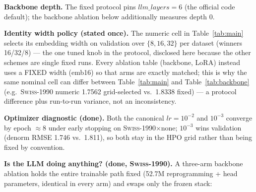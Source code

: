 \documentclass[sigconf,review]{acmart}
\newcommand{\swiss}{\textsc{Swiss-1990}}
\begin{document}
\textbf{Backbone depth.} The fixed protocol pins $\mathit{llm\_layers}{=}6$ (the
official code default); the backbone ablation below additionally measures depth 0.

\textbf{Identity width policy (stated once).} The \textsf{numeric} cell in
Table~\ref{tab:main} selects its embedding width on validation over
$\{8,16,32\}$ per dataset (winners 16/32/8) --- the one tuned knob in the
protocol, disclosed here because the other schemes are single fixed runs. Every
ablation table (backbone, LoRA) instead uses a FIXED width (emb16) so that arms
are exactly matched; this is why the same nominal cell can differ between
Table~\ref{tab:main} and Table~\ref{tab:backbone} (e.g.\ \swiss{} numeric
1.7562 grid-selected vs.\ 1.8338 fixed) --- a protocol difference plus
run-to-run variance, not an inconsistency.

\textbf{Optimizer diagnostic (done).} Both the canonical $lr=10^{-2}$ and
$10^{-3}$ converge by epoch ${\approx}8$ under early stopping on
\swiss{}$\times$\textsf{none}; $10^{-3}$ wins validation (denorm RMSE 1.746 vs.\
1.811), so both stay in the HPO grid rather than being fixed by convention.

\textbf{Is the LLM doing anything? (done, \swiss{}).} A three-arm backbone
ablation holds the entire trainable path fixed (52.7M reprogramming + head
parameters, identical in every arm) and swaps only the frozen stack:
\end{document}
